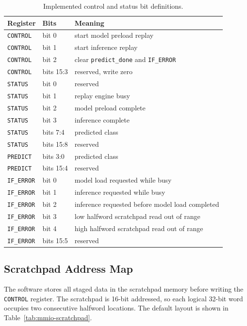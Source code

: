 \begin{table}[h]
\centering
\small
\begin{tabular}{|l|l|p{8.1cm}|}
\hline
\textbf{Register} & \textbf{Bits} & \textbf{Meaning} \\
\hline
\texttt{CONTROL} & bit 0 & start model preload replay \\
\hline
\texttt{CONTROL} & bit 1 & start inference replay \\
\hline
\texttt{CONTROL} & bit 2 & clear \texttt{predict\_done} and \texttt{IF\_ERROR} \\
\hline
\texttt{CONTROL} & bits 15:3 & reserved, write zero \\
\hline
\texttt{STATUS} & bit 0 & reserved \\
\hline
\texttt{STATUS} & bit 1 & replay engine busy \\
\hline
\texttt{STATUS} & bit 2 & model preload complete \\
\hline
\texttt{STATUS} & bit 3 & inference complete \\
\hline
\texttt{STATUS} & bits 7:4 & predicted class \\
\hline
\texttt{STATUS} & bits 15:8 & reserved \\
\hline
\texttt{PREDICT} & bits 3:0 & predicted class \\
\hline
\texttt{PREDICT} & bits 15:4 & reserved \\
\hline
\texttt{IF\_ERROR} & bit 0 & model load requested while busy \\
\hline
\texttt{IF\_ERROR} & bit 1 & inference requested while busy \\
\hline
\texttt{IF\_ERROR} & bit 2 & inference requested before model load completed \\
\hline
\texttt{IF\_ERROR} & bit 3 & low halfword scratchpad read out of range \\
\hline
\texttt{IF\_ERROR} & bit 4 & high halfword scratchpad read out of range \\
\hline
\texttt{IF\_ERROR} & bits 15:5 & reserved \\
\hline
\end{tabular}
\caption{Implemented control and status bit definitions.}
\label{tab:mmio-fields}
\end{table}

\subsection{Scratchpad Address Map}

The software stores all staged data in the scratchpad memory before writing the
\texttt{CONTROL} register. The scratchpad is 16-bit addressed, so each logical
32-bit word occupies two consecutive halfword locations. The default layout is
shown in Table~\ref{tab:mmio-scratchpad}.

